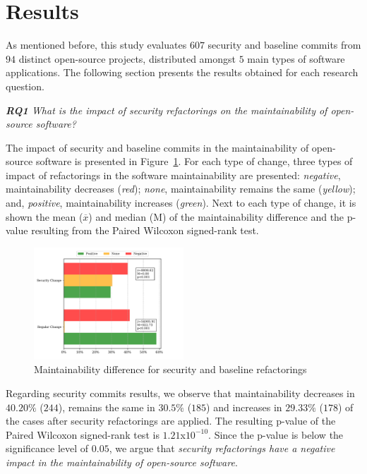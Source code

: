 \documentclass[10pt,conference]{IEEEtran}
\begin{document}
\section{Results}\label{sec:results}

As mentioned before, this study evaluates $607$ security and baseline commits
from $94$ distinct open-source projects, distributed amongst $5$ main
types of software applications. The following section presents the
results obtained for each research question.

\begin{framed}
\textit{\textbf{RQ1} What is the impact of security refactorings on the
maintainability of open-source software?}
\end{framed}

The impact of security and baseline commits in the maintainability of
open-source software is presented in Figure~\ref{fig:secvsreg}. For each type of
change, three types of impact of refactorings in the software maintainability
are presented: \emph{negative}, maintainability decreases (\emph{red});
\emph{none}, maintainability remains the same (\emph{yellow}); and,
\emph{positive}, maintainability increases (\emph{green}). Next to each
type of change, it is shown the mean ($\overline{x}$) and median (M)
of the maintainability difference and the p-value resulting from the
Paired Wilcoxon signed-rank test.

\begin{figure}[h]
 	\centering 	\includegraphics[width=0.5\textwidth]{figures/maintainability.pdf}
 	\caption{Maintainability difference for security and baseline refactorings}
	\label{fig:secvsreg}
\end{figure}

Regarding security commits results, we observe that maintainability decreases in
$40.20\%$ ($244$), remains the same in $30.5\%$ ($185$) and increases in $29.33\%$
($178$) of the cases after security refactorings are applied. The resulting
p-value of the Paired Wilcoxon signed-rank test is $1.21$x$10^{-10}$.
Since the p-value is below the significance level of $0.05$, we argue that
\emph{security refactorings have a negative impact in the maintainability of
open-source software}.
\end{document}
